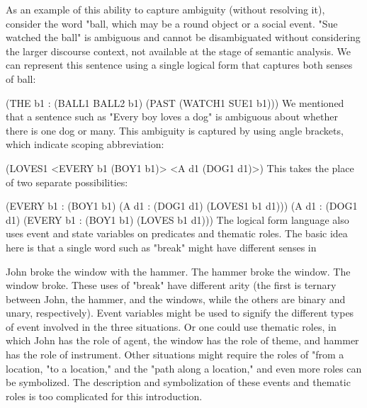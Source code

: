 As an example of this ability to capture ambiguity (without resolving it), consider the word "ball, which may be a round object or a social event. "Sue watched the ball" is ambiguous and cannot be disambiguated without considering the larger discourse context, not available at the stage of semantic analysis. We can represent this sentence using a single logical form that captures both senses of ball:

(THE b1 : ({BALL1 BALL2} b1) (PAST (WATCH1 SUE1 b1))) 
We mentioned that a sentence such as "Every boy loves a dog" is ambiguous about whether there is one dog or many. This ambiguity is captured by using angle brackets, which indicate scoping abbreviation:

(LOVES1 <EVERY b1 (BOY1 b1)> <A d1 (DOG1 d1)>)
This takes the place of two separate possibilities:

(EVERY b1 : (BOY1 b1) (A d1 : (DOG1 d1) (LOVES1 b1 d1)))
(A d1 : (DOG1 d1) (EVERY b1 : (BOY1 b1) (LOVES b1 d1))) 
The logical form language also uses event and state variables on predicates and thematic roles. The basic idea here is that a single word such as "break" might have different senses in

John broke the window with the hammer.
The hammer broke the window.
The window broke.
These uses of "break" have different arity (the first is ternary between John, the hammer, and the windows, while the others are binary and unary, respectively). Event variables might be used to signify the different types of event involved in the three situations. Or one could use thematic roles, in which John has the role of agent, the window has the role of theme, and hammer has the role of instrument. Other situations might require the roles of "from a location, "to a location," and the "path along a location," and even more roles can be symbolized. The description and symbolization of these events and thematic roles is too complicated for this introduction.

